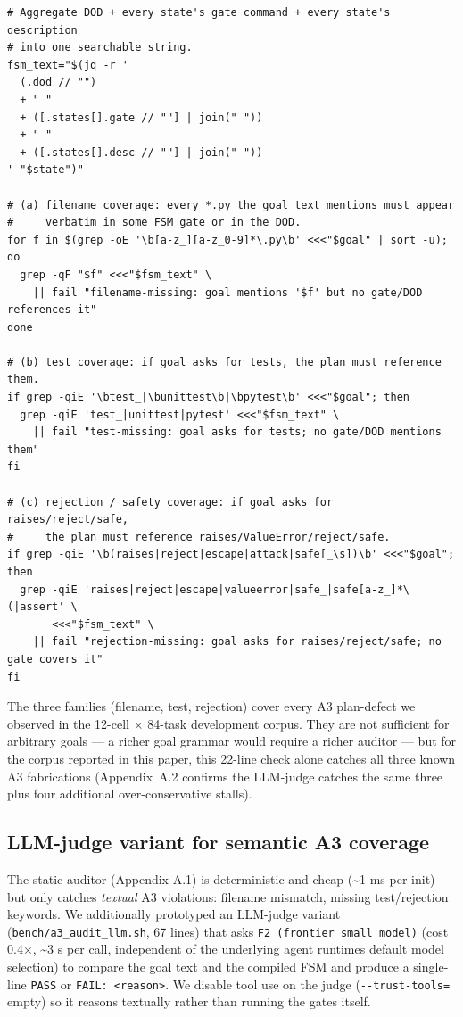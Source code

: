 \begin{small}
\begin{verbatim}
# Aggregate DOD + every state's gate command + every state's description
# into one searchable string.
fsm_text="$(jq -r '
  (.dod // "")
  + " "
  + ([.states[].gate // ""] | join(" "))
  + " "
  + ([.states[].desc // ""] | join(" "))
' "$state")"

# (a) filename coverage: every *.py the goal text mentions must appear
#     verbatim in some FSM gate or in the DOD.
for f in $(grep -oE '\b[a-z_][a-z_0-9]*\.py\b' <<<"$goal" | sort -u); do
  grep -qF "$f" <<<"$fsm_text" \
    || fail "filename-missing: goal mentions '$f' but no gate/DOD references it"
done

# (b) test coverage: if goal asks for tests, the plan must reference them.
if grep -qiE '\btest_|\bunittest\b|\bpytest\b' <<<"$goal"; then
  grep -qiE 'test_|unittest|pytest' <<<"$fsm_text" \
    || fail "test-missing: goal asks for tests; no gate/DOD mentions them"
fi

# (c) rejection / safety coverage: if goal asks for raises/reject/safe,
#     the plan must reference raises/ValueError/reject/safe.
if grep -qiE '\b(raises|reject|escape|attack|safe[_\s])\b' <<<"$goal"; then
  grep -qiE 'raises|reject|escape|valueerror|safe_|safe[a-z_]*\(|assert' \
       <<<"$fsm_text" \
    || fail "rejection-missing: goal asks for raises/reject/safe; no gate covers it"
fi
\end{verbatim}
\end{small}

The three families (filename, test, rejection) cover every A3 plan-defect we
observed in the 12-cell $\times$ 84-task development corpus. They are not
sufficient for arbitrary goals --- a richer goal grammar would require a
richer auditor --- but for the corpus reported in this paper, this 22-line
check alone catches all three known A3 fabrications (Appendix~A.2 confirms the
LLM-judge catches the same three plus four additional over-conservative
stalls).


\subsection{LLM-judge variant for semantic A3 coverage}\label{app:llm-judge}
\label{llm-judge-auditor-semantic-a3-coverage-with-richer-reasoning}

The static auditor (Appendix A.1) is deterministic and cheap (\textasciitilde1 ms per init) but only catches
\emph{textual} A3 violations: filename mismatch, missing test/rejection keywords. We additionally
prototyped an LLM-judge variant (\texttt{bench/a3\_audit\_llm.sh}, 67 lines) that asks
\texttt{F2\ (frontier\ small\ model)} (cost 0.4×, \textasciitilde3 s per call, independent of the underlying agent runtime\textquotesingle s default model selection) to compare the
goal text and the compiled FSM and produce a single-line \texttt{PASS} or \texttt{FAIL:\ \textless{}reason\textgreater{}}. We
disable tool use on the judge (\texttt{-\/-trust-tools=} empty) so it reasons textually rather than
running the gates itself.

